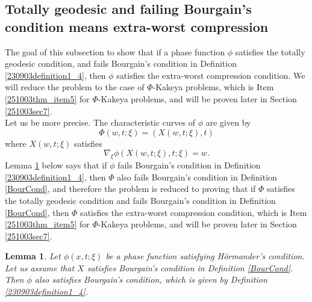 \documentclass{article}
\numberwithin{equation}{section}
\theoremstyle{plain}
\newtheorem{lemma}[theorem]{Lemma}
\begin{document}
\fi




\subsection{Totally geodesic and failing Bourgain's condition means extra-worst compression}





The goal of this subsection to show that if a phase function $\phi$ satisfies the totally geodesic condition, and fails Bourgain's condition in Definition \ref{230903definition1_4}, then $\phi$ satisfies the extra-worst compression condition. We will reduce the problem to the case of $\Phi$-Kakeya problems, which is Item \ref{251003thm_item5} for $\Phi$-Kakeya problems, and will be proven later in Section \ref{251003sec7}. \\


Let us be more precise. 
The characteristic curves of $\phi$ are given by 
\begin{equation}
\Phi(w, t; \xi)= (X(w, t; \xi), t)
\end{equation}
where $X(w, t; \xi)$ satisfies 
\begin{equation}\label{251004e4_55}
\nabla_{\xi} \phi(X(w, t; \xi), t; \xi)=w.
\end{equation}
Lemma \ref{251004lemma4_2} below says that if $\phi$ fails Bourgain's condition in Definition \ref{230903definition1_4}, then $\Phi$ also fails Bourgain's condition in Definition \ref{BourCond}, and therefore the problem is reduced to proving that if $\Phi$ satisfies the totally geodesic condition and fails Bourgain's condition in Definition \ref{BourCond}, then $\Phi$ satisfies the extra-worst compression condition, which is Item \ref{251003thm_item5} for $\Phi$-Kakeya problems, and will be proven later in Section \ref{251003sec7}.  



\begin{lemma}\label{251004lemma4_2}
Let $\phi(x, t; \xi)$ be a phase function satisfying H\"ormander's condition. 
Let us assume that $X$ satisfies Bourgain's condition in Definition \ref{BourCond}. Then $\phi$ also satisfies Bourgain's condition, which is given by Definition \ref{230903definition1_4}. 
\end{lemma}
\end{document}
